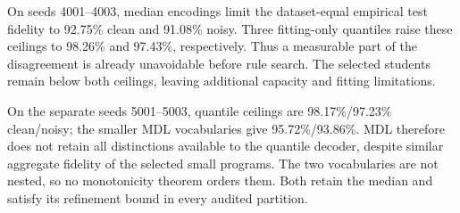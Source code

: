 On seeds 4001--4003, median encodings limit the dataset-equal empirical test fidelity to 92.75\% clean and 91.08\% noisy. Three fitting-only quantiles raise these ceilings to 98.26\% and 97.43\%, respectively. Thus a measurable part of the disagreement is already unavoidable before rule search. The selected students remain below both ceilings, leaving additional capacity and fitting limitations.

On the separate seeds 5001--5003, quantile ceilings are 98.17\%/97.23\% clean/noisy; the smaller MDL vocabularies give 95.72\%/93.86\%. MDL therefore does not retain all distinctions available to the quantile decoder, despite similar aggregate fidelity of the selected small programs. The two vocabularies are not nested, so no monotonicity theorem orders them. Both retain the median and satisfy its refinement bound in every audited partition.
